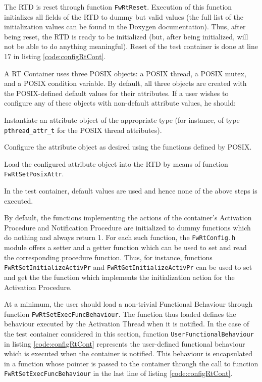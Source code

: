 \documentclass[a4paper,10pt]{article}
\newenvironment{fw_enumerate}					%
{\begin{enumerate}
  \setlength{\itemsep}{1mm}
  \setlength{\parskip}{0pt}
  \setlength{\parsep}{0pt}}
{\end{enumerate}}
\begin{document}
The RTD is reset through function \texttt{FwRtReset}. Execution of this function initializes all fields of the RTD to dummy but valid values (the full list of the initialization values can be found in the Doxygen documentation). Thus, after being reset, the RTD is ready to be initialized (but, after being initialized, will not be able to do anything meaningful). Reset of the test container is done at line 17 in listing \ref{code:configRtCont}.

A RT Container uses three POSIX objects: a POSIX thread, a POSIX mutex, and a POSIX condition variable. By default, all three objects are created with the POSIX-defined default values for their attributes. If a user wishes to configure any of these objects with non-default attribute values, he should:

\begin{fw_enumerate}
\item Instantiate an attribute object of the appropriate type (for instance, of type \texttt{pthread\_attr\_t} for the POSIX thread attributes).  
\item Configure the attribute object as desired using the functions defined by POSIX.
\item Load the configured attribute object into the RTD by means of function \texttt{FwRtSetPosixAttr}.
\end{fw_enumerate}

In the test container, default values are used and hence none of the above steps is executed.

By default, the functions implementing the actions of the container's Activation Procedure and Notification Procedure are initialized to dummy functions which do nothing and always return 1. For each such function, the \texttt{FwRtConfig.h} module offers a setter and a getter function which can be used to set and read the corresponding procedure function. Thus, for instance, functions \texttt{FwRtSetInitializeActivPr} and \texttt{FwRtGetInitializeActivPr} can be used to set and get the the function which implements the initialization action for the Activation Procedure.

At a minimum, the user should load a non-trivial Functional Behaviour through function \texttt{FwRtSetExecFuncBehaviour}. The function thus loaded defines the behaviour executed by the Activation Thread when it is notified. In the case of the test container considered in this section, function \texttt{UserFunctionalBehaviour} in listing \ref{code:configRtCont} represents the user-defined functional behaviour which is executed when the container is notified. This behaviour is encapsulated in a function whose pointer is passed to the container through the call to function \texttt{FwRtSetExecFuncBehaviour} in the last line of listing \ref{code:configRtCont}.
\end{document}
